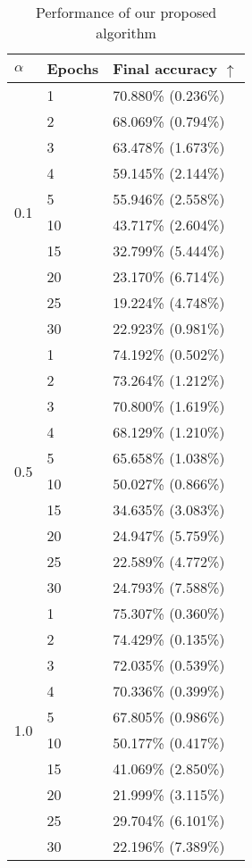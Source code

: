 \documentclass[conference,compsoc]{IEEEtran}
\begin{document}
\begin{table}[ht]
\centering
\caption{Performance of our proposed algorithm}
    \centering
    \begin{tabular}{lll}
    \hline
    $\alpha$ & \textbf{Epochs} & \textbf{Final accuracy $\uparrow$} \\
    \hline
    \multirow{10}{*}{0.1} & 1 & 70.880\% (0.236\%) \\
    & 2 & 68.069\% (0.794\%) \\
    & 3 & 63.478\% (1.673\%) \\
    & 4 & 59.145\% (2.144\%) \\
    & 5 & 55.946\% (2.558\%) \\
    & 10 & 43.717\% (2.604\%) \\
    & 15 & 32.799\% (5.444\%) \\
    & 20 & 23.170\% (6.714\%) \\
    & 25 & 19.224\% (4.748\%) \\
    & 30 & 22.923\% (0.981\%) \\
    \hline
    \multirow{10}{*}{0.5} & 1 & 74.192\% (0.502\%) \\
    & 2 & 73.264\% (1.212\%) \\
    & 3 & 70.800\% (1.619\%) \\
    & 4 & 68.129\% (1.210\%) \\
    & 5 & 65.658\% (1.038\%) \\
    & 10 & 50.027\% (0.866\%) \\
    & 15 & 34.635\% (3.083\%) \\
    & 20 & 24.947\% (5.759\%) \\
    & 25 & 22.589\% (4.772\%) \\
    & 30 & 24.793\% (7.588\%) \\
    \hline
    \multirow{10}{*}{1.0} & 1 & 75.307\% (0.360\%) \\
    & 2 & 74.429\% (0.135\%) \\
    & 3 & 72.035\% (0.539\%) \\
    & 4 & 70.336\% (0.399\%) \\
    & 5 & 67.805\% (0.986\%) \\
    & 10 & 50.177\% (0.417\%) \\
    & 15 & 41.069\% (2.850\%) \\
    & 20 & 21.999\% (3.115\%) \\
    & 25 & 29.704\% (6.101\%) \\
    & 30 & 22.196\% (7.389\%) \\
    \hline

\end{tabular}
\end{table}
\end{document}
